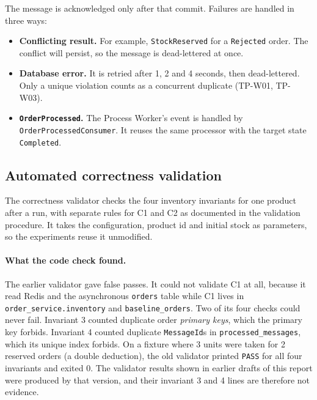 \documentclass[a4paper]{report}
\begin{document}
The message is acknowledged only after that commit. Failures are handled in
three ways:

\begin{itemize}
  \item \textbf{Conflicting result.} For example, \texttt{StockReserved} for
    a \texttt{Rejected} order. The conflict will persist, so the message is
    dead-lettered at once.
  \item \textbf{Database error.} It is retried after 1, 2 and 4 seconds, then
    dead-lettered. Only a unique violation counts as a concurrent duplicate
    (TP-W01, TP-W03).
  \item \textbf{\texttt{OrderProcessed}.} The Process Worker's event is
    handled by \texttt{OrderProcessedConsumer}. It reuses the same processor
    with the target state \texttt{Completed}.
\end{itemize}

\subsection{Automated correctness validation}
\label{sec:validation}

The correctness validator checks the four inventory invariants for one product
after a run, with separate rules for C1 and C2 as documented in the validation
procedure. It takes the configuration, product id and initial stock as
parameters, so the experiments reuse it unmodified.

\paragraph{What the code check found.} The earlier validator gave
false passes. It could not validate C1 at all, because it read Redis and the
asynchronous \texttt{orders} table while C1 lives in
\texttt{order\_service.inventory} and \texttt{baseline\_orders}. Two of its
four checks could never fail. Invariant 3 counted duplicate order
\emph{primary keys}, which the primary key forbids. Invariant 4 counted
duplicate \texttt{MessageId}s in \texttt{processed\_messages}, which its unique
index forbids. On a fixture where 3 units were taken for 2 reserved orders
(a double deduction), the old validator printed \texttt{PASS} for all four
invariants and exited 0. The validator results shown in earlier drafts of
this report were produced by that version, and their invariant 3 and 4
lines are therefore not evidence.
\end{document}
